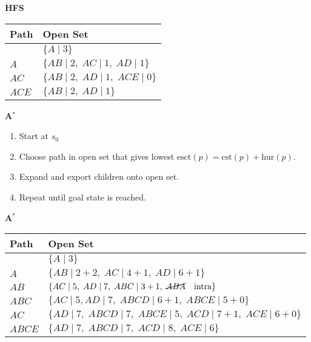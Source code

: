 \begin{example} \textbf{HFS}
    \begin{center}
        \begin{tabular}{ll}
        \toprule
        \textbf{Path} & \textbf{Open Set} \\
        \midrule
         & $\{A \mid 3\}$ \\
        $A$ & $\{AB \mid 2, \; AC \mid 1, \; AD \mid 1\}$ \\
        $AC$ & $\{AB \mid 2, \; AD \mid 1, \; ACE \mid 0\}$ \\
        $ACE$ & $\{AB \mid 2, \; AD \mid 1\}$ \\
        \bottomrule
        \end{tabular}
    \end{center}
\end{example}


\begin{process} \textbf{A$^*$}
    \begin{enumerate}
        \item Start at $s_0$ 
        \item Choose path in open set that gives lowest $\text{esct}(p) = \text{cst}(p) + \text{hur}(p)$.
        \item Expand and export children onto open set.
        \item Repeat until goal state is reached.
    \end{enumerate}
\end{process}

\begin{example} \textbf{A$^*$}
    \begin{center}
        \begin{tabular}{ll}
        \toprule
        \textbf{Path} & \textbf{Open Set} \\
        \midrule
         & $\{A \mid 3 \}$ \\
        $A$ & $\{AB \mid 2 + 2, \; AC \mid 4 + 1, \; AD \mid 6 + 1\}$ \\
        $AB$ & $\{AC \mid 5, \; AD \mid 7, \; ABC \mid 3 + 1, \; \cancel{ABA} \quad \text{intra} \}$ \\
        $ABC$ & $\{AC \mid 5, AD \mid 7, \; ABCD \mid 6 + 1, \; ABCE \mid 5 + 0 \}$ \\
        $AC$ & $\{AD \mid 7, \; ABCD \mid 7, \; ABCE \mid 5, \; ACD \mid 7 + 1, \; ACE \mid 6 + 0 \}$ \\
        $ABCE$ & $\{AD \mid 7, \; ABCD \mid 7, \; ACD \mid 8, \; ACE \mid 6 \}$ \\
        \bottomrule
        \end{tabular}
    \end{center}
\end{example}

